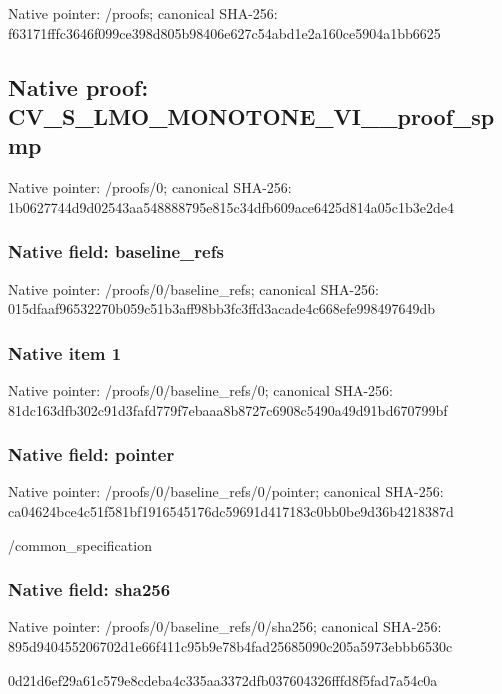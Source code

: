 \documentclass[10pt,a4paper]{article}
\begin{document}
Native pointer: /proofs; canonical SHA-256: f63171fffc3646f099ce398d805b98406e627c54abd1e2a160ce5904a1bb6625

\subsection{Native proof: CV\_\allowbreak{}S\_\allowbreak{}LMO\_\allowbreak{}MONOTONE\_\allowbreak{}VI\_\allowbreak{}\_\allowbreak{}proof\_\allowbreak{}spmp}
Native pointer: /proofs/0; canonical SHA-256: 1b0627744d9d02543aa548888795e815c34dfb609ace6425d814a05c1b3e2de4

\subsubsection{Native field: baseline\_\allowbreak{}refs}
Native pointer: /proofs/0/baseline\_\allowbreak{}refs; canonical SHA-256: 015dfaaf96532270b059c51b3aff98bb3fc3ffd3acade4c668efe998497649db

\subsubsection{Native item 1}
Native pointer: /proofs/0/baseline\_\allowbreak{}refs/0; canonical SHA-256: 81dc163dfb302c91d3fafd779f7ebaaa8b8727c6908c5490a49d91bd670799bf

\subsubsection{Native field: pointer}
Native pointer: /proofs/0/baseline\_\allowbreak{}refs/0/pointer; canonical SHA-256: ca04624bce4c51f581bf1916545176dc59691d417183c0bb0be9d36b4218387d

\begingroup\raggedright\sloppy /\allowbreak{}common\_\allowbreak{}specification\par\endgroup

\subsubsection{Native field: sha256}
Native pointer: /proofs/0/baseline\_\allowbreak{}refs/0/sha256; canonical SHA-256: 895d940455206702d1e66f411c95b9e78b4fad25685090c205a5973ebbb6530c

\begingroup\raggedright\sloppy 0d21d6ef29a61c579e8cdeba4c335aa3372dfb037604326fffd8f5fad7a54c0a\par\endgroup
\end{document}
